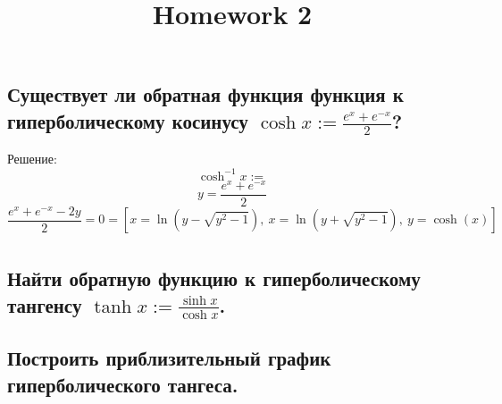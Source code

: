 \documentclass[a4paper, fontsize=10pt]{article}
\title{Homework 2}
\date{}
\begin{document}
\maketitle

\section{}
\subsection{\normalsize \normalfont Существует ли обратная функция функция к гиперболическому косинусу $\cosh{x} := \frac{e^x + e^{-x}}{2}$?}

\indent Решение:
$$\cosh^{-1}{x} :=$$
$$y = \frac{e^x + e^{-x}}{2}$$
$$ \frac{e^x + e^{-x} - 2y}{2} = 0 = [ x = \ln{(y - \sqrt{y^{2} - 1})}, \  x = \ln{(y + \sqrt{y^{2} - 1})}, \  y = \cosh{(x)}]$$
\begin{align*}
\end{align*}


\subsection{\normalsize \normalfont Найти обратную функцию к гиперболическому тангенсу $\tanh{x} := \frac{\sinh{x}}{\cosh{x}}$.}
\subsection{\normalsize \normalfont Построить приблизительный график гиперболического тангеса.}
\end{document}

